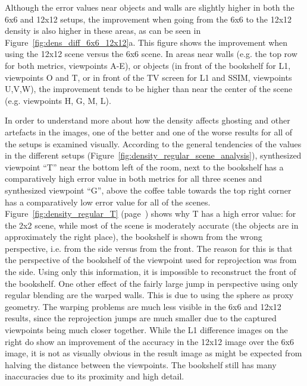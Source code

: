 Although the error values near objects and walls are slightly higher in both the 6x6 and 12x12 setups, the improvement when going from the 6x6 to the 12x12 density is also higher in these areas, as can be seen in Figure~\ref{fig:dens_diff_6x6_12x12}a. This figure shows the improvement when using the 12x12 scene versus the 6x6 scene. In areas near walls (e.g. the top row for both metrics, viewpoints A-E), or objects (in front of the bookshelf for L1, viewpoints O and T, or in front of the TV screen for L1 and SSIM, viewpoints U,V,W), the improvement tends to be higher than near the center of the scene (e.g. viewpoints H, G, M, L).

In order to understand more about how the density affects ghosting and other artefacts in the images, one of the better and one of the worse results for all of the setups is examined visually. According to the general tendencies of the values in the different setups (Figure~\ref{fig:density_regular_scene_analysis}), synthesized viewpoint ``T'' near the bottom left of the room, next to the bookshelf has a comparatively high error value in both metrics for all three scenes and synthesized viewpoint ``G'', above the coffee table towards the top right corner has a comparatively low error value for all of the scenes.
Figure~\ref{fig:density_regular_T} (page~\pageref{fig:density_regular_T}) shows why T has a high error value: for the 2x2 scene, while most of the scene is moderately accurate (the objects are in approximately the right place), the bookshelf is shown from the wrong perspective, i.e. from the side versus from the front. The reason for this is that the perspective of the bookshelf of the viewpoint used for reprojection was from the side. Using only this information, it is impossible to reconstruct the front of the bookshelf. One other effect of the fairly large jump in perspective using only regular blending are the warped walls. This is due to using the sphere as proxy geometry. The warping problems are much less visible in the 6x6 and 12x12 results, since the reprojection jumps are much smaller due to the captured viewpoints being much closer together. While the L1 difference images on the right do show an improvement of the accuracy in the 12x12 image over the 6x6 image, it is not as visually obvious in the result image as might be expected from halving the distance between the viewpoints. The bookshelf still has many inaccuracies due to its proximity and high detail.
